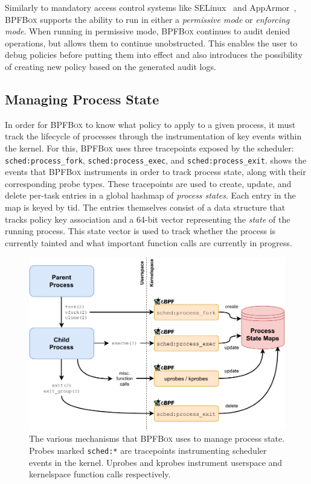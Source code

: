 \documentclass[
  fontsize=12pt,
  titlepage=firstiscover,
  paper=letter,
oneside,
  cleardoublepage=plain,
  parskip=half-,
  DIV=10,
  parindent,
  appendixprefix,
  chapterprefix,
  listof=totoc,
]{scrbook}
\newcommand{\bpfbox}{\textsc{BPFBox}}
\begin{document}
Similarly to mandatory access control systems like SELinux~\cite{smalley2001_selinux} and
AppArmor~\cite{cowan2000_apparmor}, \bpfbox{} supports the ability to run in either a
\textit{permissive mode} or \textit{enforcing mode}.  When running in permissive mode,
\bpfbox{} continues to audit denied operations, but allows them to continue unobstructed.
This enables the user to debug policies before putting them into effect and also
introduces the possibility of creating new policy based on the generated audit logs.



\subsection{Managing Process State}\label{ss:bpfbox-state}

In order for \bpfbox{} to know what policy to apply to a given process, it must track the
lifecycle of processes through the instrumentation of key events within the kernel. For
this, \bpfbox{} uses three tracepoints exposed by the scheduler:
\texttt{sched:process\_fork}, \texttt{sched:process\_exec}, and
\texttt{sched:process\_exit}.  shows the events that \bpfbox{}
instruments in order to track process state, along with their corresponding probe types.
These tracepoints are used to create, update, and delete per-task entries in a global
hashmap of \textit{process states}.  Each entry in the map is keyed by \gls{tid}. The
entries themselves consist of a data structure that tracks policy key association and
a 64-bit vector representing the \textit{state} of the running process.  This state vector
is used to track whether the process is currently tainted and what important function
calls are currently in progress.

\begin{figure}[htbp]
  \centering
  \includegraphics[width=0.8\linewidth]{figs/bpfbox/process-lifecycle.pdf}
  \caption[The various mechanisms that \bpfbox{} uses to manage process state]{
    The various mechanisms that \bpfbox{} uses to manage process state.
    Probes marked \texttt{sched:*} are tracepoints instrumenting scheduler events
    in the kernel. Uprobes and kprobes instrument userspace
    and kernelspace function calls respectively.
  }\label{fig:bpfbox-process-lifecycle}
\end{figure}
\end{document}
